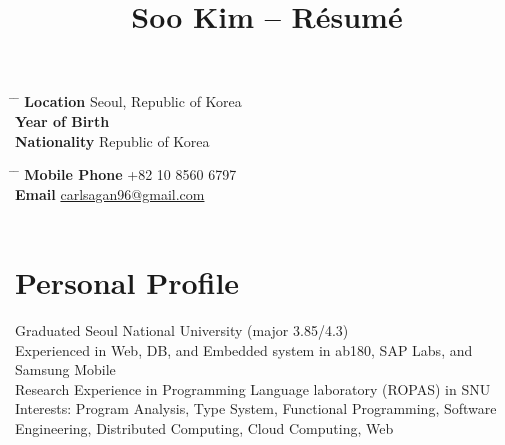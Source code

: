 \documentclass[10pt]{article} %
\begin{document}

\title{Soo Kim -- Résumé} %


\parbox[c][3em][c]{0.5\textwidth}{ %
\begin{tabbing} %
\hspace{4cm} \= \hspace{4cm} \= \kill %
\textbf{Location} \> Seoul, Republic of Korea\\ %
\textbf{Year of Birth} \\ %
\textbf{Nationality} \> Republic of Korea\\ %
\end{tabbing}
}
\hfill %
\parbox[c][3em][c]{0.5\textwidth}{ %
\begin{tabbing} %
\hspace{4cm} \= \hspace{4cm} \= \kill %
\textbf{Mobile Phone} \> +82 10 8560 6797\\ %
\textbf{Email} \> \href{mailto:carlsagan96@gmail.com}{carlsagan96@gmail.com}\\ %
\\
\end{tabbing}}


\section{Personal Profile}

Graduated Seoul National University (major 3.85/4.3)\\
Experienced in Web, DB, and Embedded system in ab180, SAP Labs, and Samsung Mobile\\
Research Experience in Programming Language laboratory (ROPAS) in SNU\\
Interests: Program Analysis, Type System, Functional Programming, Software Engineering, Distributed Computing, Cloud Computing, Web
\end{document}
